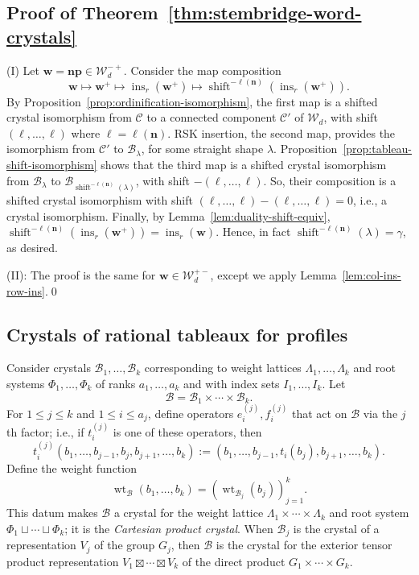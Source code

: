 \documentclass[12pt]{amsart}
\newcommand{\bs}{\boldsymbol}
\DeclareMathOperator{\ins}{\operatorname{ins}}
\theoremstyle{definition}
\theoremstyle{remark}
\begin{document}
\subsection{Proof of Theorem~\ref{thm:stembridge-word-crystals}}\label{sec:proof32}
(I) Let ${\bs w}={\bs n}{\bs p}\in {\mathcal W}_d^{-+}$. Consider the map composition 
\[
{\bs w} \mapsto {\bs w}^+ \mapsto \ins_r({\bs w}^+) \mapsto \operatorname{shift}^{-\ell({\bs n})}(\ins_r({\bs w}^+)).
\]
By Proposition~\ref{prop:ordinification-isomorphism}, the first map is a shifted crystal isomorphism from 
$\mathcal{C}$ to a  connected component $\mathcal{C}'$ of ${\mathcal W}_d$,
with shift $(\ell,\ldots,\ell)$ where $\ell=\ell({\bs n})$.
RSK insertion, the second map, provides the isomorphism from 
$\mathcal{C}'$ to ${\mathcal B}_{\lambda}$, for some straight shape $\lambda$. 
Proposition~\ref{prop:tableau-shift-isomorphism} shows that 
the third map is a shifted crystal isomorphism from ${\mathcal B}_{\lambda}$ to
${\mathcal B}_{\operatorname{shift}^{-\ell({\bs n})}(\lambda)}$, with shift 
$-(\ell,\ldots,\ell)$. So, their composition is a shifted crystal isomorphism 
with shift $(\ell,\ldots,\ell) - (\ell,\ldots,\ell) = 0$, i.e., a crystal isomorphism. 
Finally,  by Lemma~\ref{lem:duality-shift-equiv},
$\operatorname{shift}^{-\ell({\bs n})}(\ins_r({\bs w}^+)) 
= \ins_r({\bs w})$.
Hence, in fact $\operatorname{shift}^{-\ell({\bs n})}(\lambda)=\gamma$, as desired.

(II): The proof is the same for $\bs{w}\in {\mathcal W}_d^{+-}$, 
except we apply Lemma~\ref{lem:col-ins-row-ins}.\qed



\subsection{Crystals of rational tableaux for profiles} \label{subsec:Cryprofiles}

Consider crystals $\mathcal{B}_1,\ldots,\mathcal{B}_k$ corresponding to weight lattices $\Lambda_1,\ldots,\Lambda_k$ and root systems $\Phi_1,\ldots,\Phi_k$ 
of ranks $a_1,\ldots,a_k$ and with index sets $I_1,\ldots,I_k$. Let 
\[\mathcal{B} = \mathcal{B}_1\times \cdots\times \mathcal{B}_k.\] 
For $1\le j\le k$ and $1\le i\le a_j$, define operators
$e_i^{(j)},f_i^{(j)}$ that act on $\mathcal{B}$ via the $j$th factor; i.e., if
$t_i^{(j)}$ is one of these operators, then
\[
t_i^{(j)} (b_1,\ldots, b_{j-1}, b_j, b_{j+1}, \ldots, b_k) := (b_1,\ldots, b_{j-1}, t_i(b_j), b_{j+1}, \ldots, b_k).
\]
Define the weight function
\begin{equation}
\label{eqn:July18aaa}
\operatorname{wt}_{{\mathcal B}}(b_1,\ldots,b_k)=(\operatorname{wt}_{{\mathcal B}_j}(b_j))_{j=1}^k.
\end{equation}
This datum makes $\mathcal{B}$ a crystal for the weight lattice $\Lambda_1\times \cdots\times \Lambda_k$ and root system $\Phi_1\sqcup \cdots\sqcup \Phi_k$; it is the \emph{Cartesian product crystal}. When $\mathcal{B}_j$ is the crystal of a representation $V_j$ of the group $G_j$, then $\mathcal{B}$ is the crystal for the exterior tensor product representation $V_1\boxtimes \cdots \boxtimes V_k$ of the direct product $G_1\times\cdots\times G_k$.
\end{document}

